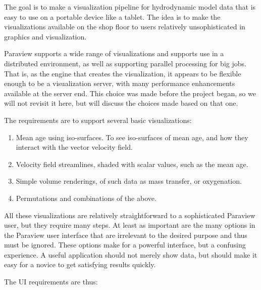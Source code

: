 \documentclass[11pt]{tsmemo}
\begin{document}
\subject{Documentation of technology decisions for AMS-102}

\begin{memo}

The goal is to make a visualization pipeline for hydrodynamic model data
that is easy to use on a portable device like a tablet.  The idea is
to make the visualizations available on the shop floor to
users relatively unsophisticated in graphics and visualization.

Paraview supports a wide range of visualizations and supports use in a
distributed environment, as well as supporting parallel processing for
big jobs.  That is, as the engine that creates the visualization, it
appears to be flexible enough to be a visualization server, with many
performance enhancements available at the server end.  This choice was
made before the project began, so we will not revisit it here, but
will discuss the choices made based on that one.

The requirements are to support several basic visualizations:

\begin{enumerate}

\item Mean age using iso-surfaces.  To see iso-surfaces of mean age,
  and how they interact with the vector velocity field.

\item Velocity field streamlines, shaded with scalar values, such as
  the mean age.

\item Simple volume renderings, of such data as mass transfer, or
  oxygenation.

\item Permutations and combinations of the above.
\end{enumerate}


All these visualizations are relatively straightforward to a
sophisticated Paraview user, but they require many steps.  At least as
important are the many options in the Paraview user interface that are
irrelevant to the desired purpose and thus must be ignored.  These
options make for a powerful interface, but a confusing experience.  A
useful application should not merely show data, but should make it
easy for a novice to get satisfying results quickly.

The UI requirements are thus:

\begin{itemize}


\end{itemize}
\end{memo}
\end{document}
